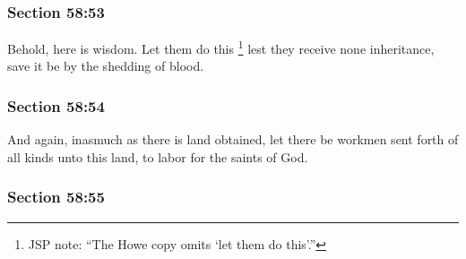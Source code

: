 
	\subsubsection{Section 58:53} %
		\label{DC58-53}

		Behold, here is wisdom. Let them do this%
		\footnote{%
			JSP note: ``The Howe copy omits `let them do this'.''
			} 
		lest they receive none inheritance, save it be by the shedding of blood.


	\subsubsection{Section 58:54} %
		\label{DC58-54}

		And again, inasmuch as there is land obtained, let there be workmen sent forth of all kinds unto this land, to labor for the saints of God.


	\subsubsection{Section 58:55} %
		\label{DC58-55}

